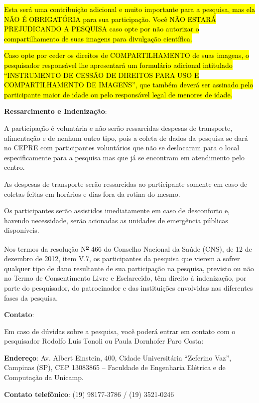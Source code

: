 \documentclass[a4paper, 12pt]{article}
\begin{document}
\hl{Esta será uma contribuição adicional e muito importante para a pesquisa, mas ela NÃO É OBRIGATÓRIA para sua participação. Você NÃO ESTARÁ PREJUDICANDO A PESQUISA caso opte por não autorizar o compartilhamento de suas imagens para divulgação científica.}

\hl{Caso opte por ceder os direitos de COMPARTILHAMENTO de suas imagens, o pesquisador responsável lhe apresentará um formulário adicional intitulado ``INSTRUMENTO DE CESSÃO DE DIREITOS PARA USO E COMPARTILHAMENTO DE IMAGENS'', que também deverá ser assinado pelo participante maior de idade ou pelo responsável legal de menores de idade.}

\vspace{10pt}
\textbf{Ressarcimento e Indenização}:
	
A participação é voluntária e não serão ressarcidas despesas de transporte, alimentação e de nenhum outro tipo, pois a coleta de dados da pesquisa se dará no CEPRE com participantes voluntários que não se deslocaram para o local especificamente para a pesquisa mas que já se encontram em atendimento pelo centro.

As despesas de transporte serão ressarcidas ao participante somente em caso de coletas feitas em horários e dias fora da rotina do mesmo.

Os participantes serão assistidos imediatamente em caso de desconforto e, havendo necessidade, serão acionadas as unidades de emergência públicas disponíveis. 

Nos termos da resolução N\textsuperscript{\underline{o}} 466 do Conselho Nacional da Saúde (CNS), de 12 de dezembro de 2012, item V.7, os participantes da pesquisa que vierem a sofrer qualquer tipo de dano resultante de sua participação na pesquisa, previsto ou não no Termo de Consentimento Livre e Esclarecido, têm direito à indenização, por parte do pesquisador, do patrocinador e das instituições envolvidas nas diferentes fases da pesquisa.

\vspace{10pt}
\textbf{Contato}:

Em caso de dúvidas sobre a pesquisa, você poderá entrar em contato com o pesquisador Rodolfo Luis Tonoli ou Paula Dornhofer Paro Costa:

\textbf{Endereço}: Av. Albert Einstein, 400, Cidade Universitária “Zeferino Vaz”, Campinas (SP), CEP
13083865 – Faculdade de Engenharia Elétrica e de Computação da Unicamp.

\textbf{Contato telefônico}: (19) 98177-3786 / (19) 3521-0246
\end{document}
